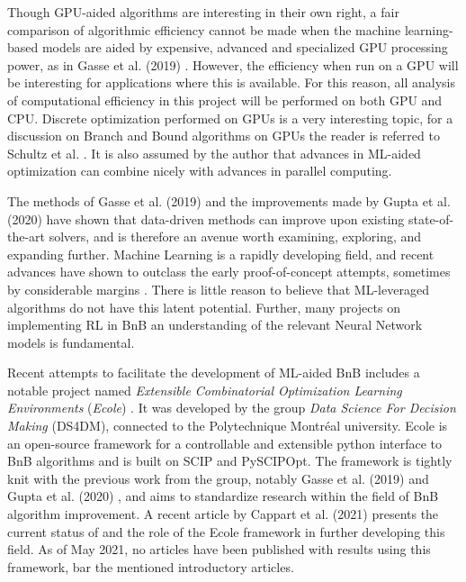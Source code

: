 Though \gls{GPU}-aided algorithms are interesting in their own right, a fair comparison of algorithmic efficiency cannot be made when the machine learning-based models are aided by expensive, advanced and specialized \gls{GPU} processing power, as in Gasse et al. (2019) \cite{gasse2019exact}. However, the efficiency when run on a \gls{GPU} will be interesting for applications where this is available. 
For this reason, all analysis of computational efficiency in this project will be performed on both \gls{GPU} and \gls{CPU}. Discrete optimization performed on \gls{GPU}s is a very interesting topic, for a discussion on Branch and Bound algorithms on \gls{GPU}s the reader is referred to Schultz et al. \cite{schulz2013gpu}. It is also assumed by the author that advances in ML-aided optimization can combine nicely with advances in parallel computing.

The methods of Gasse et al. (2019) \cite{gasse2019exact} and the improvements made by Gupta et al. (2020) \cite{gupta2020hybrid} have shown that data-driven methods can improve upon existing state-of-the-art solvers, and is therefore an avenue worth examining, exploring, and expanding further. Machine Learning is a rapidly developing field, and recent advances have shown to outclass the early proof-of-concept attempts, sometimes by considerable margins \cite{holzinger2018current}. There is little reason to believe that \gls{ML}-leveraged algorithms do not have this latent potential. Further, many projects on implementing \gls{RL} in \gls{BnB} \cite{tang2020reinforcement,etheve2020reinforcement} an understanding of the relevant Neural Network models is fundamental. 

Recent attempts to facilitate the development of \gls{ML}-aided \gls{BnB} includes a notable project named \textit{Extensible Combinatorial Optimization Learning Environments} (\emph{Ecole}) \cite{prouvost2020ecole, prouvost2021ecole}. It was developed by the group \textit{Data Science For Decision Making} (\gls{DS4DM}), connected to the Polytechnique Montr\'{e}al university. \gls{Ecole} is an open-source framework for a controllable and extensible python interface to \gls{BnB} algorithms and is built on \gls{SCIP} and PySCIPOpt. The framework is tightly knit with the previous work from the group, notably Gasse et al. (2019) \cite{gasse2019exact} and Gupta et al. (2020) \cite{gupta2020hybrid}, and aims to standardize research within the field of \gls{BnB} algorithm improvement.  
 A recent article by
Cappart et al. (2021) \cite{cappart2021combinatorial} presents the current status of and the role of the \gls{Ecole} framework in further developing this field. 
As of May 2021, no articles have been published with results using this framework, bar the mentioned introductory articles.



